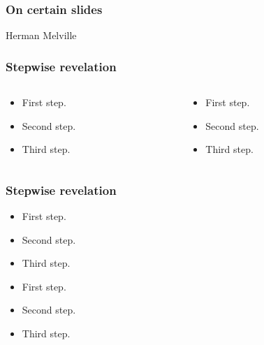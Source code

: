 \documentclass[11pt]{beamer}
\renewcommand{\emph}[1]{\textcolor{magenta}{#1}}
\begin{document}
\begin{frame}
  \frametitle{On certain slides}
  \begin{block}{Herman Melville}
    \onslide<3>{\emph{He who has never failed somewhere, that
        man can not be great.} }%
  \end{block}
\end{frame}


\begin{frame}
  \frametitle{Stepwise revelation}
  \begin{columns}
    \begin{column}{.5\textwidth}
      \begin{itemize}
      \item<1-> First step.
      \item<2-> Second step.
      \item<3-> Third step.
      \end{itemize}
    \end{column}
    \begin{column}{.5\textwidth}
      \begin{itemize}
      \item<1-> First step.
      \item<2-> Second step.
      \item<3-> Third step.
      \end{itemize}
    \end{column}
  \end{columns}
\end{frame}

\begin{frame}
  \frametitle{Stepwise revelation}
  \begin{minipage}{.45\linewidth}
    \begin{itemize}[<+->]
    \item First step.
    \item Second step.
    \item Third step.
    \end{itemize}
  \end{minipage}
  \begin{minipage}{.45\linewidth}
    \begin{itemize}[<+- | alert@+>]
    \item First step.
    \item Second step.
    \item Third step.
    \end{itemize}
  \end{minipage}
\end{frame}
\end{document}
